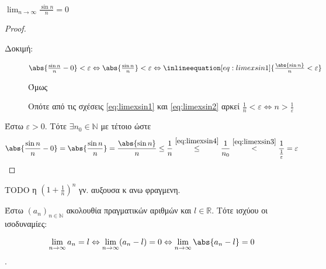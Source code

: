 \documentclass[main.tex]{subfiles}
\begin{document}
\begin{examples}
\begin{enumerate}[i)]
        \item $ \lim_{n \to \infty} \frac{\sin{n}}{n} = 0 $

            \begin{proof}
            \item {}
                \begin{description}
                    \item[Δοκιμή:] $ \abs{\frac{\sin{n}}{n} - 0} < 
                        \varepsilon \Leftrightarrow \abs{\frac{\sin{n}}{n}}
                        < \varepsilon \Leftrightarrow 
                        \inlineequation[eq:limexsin1]{\frac{\abs{\sin{n}}}
                        {n} < \varepsilon} $

                        Όμως

                        Οπότε από τις σχέσεις \eqref{eq:limexsin1} και 
                        \eqref{eq:limexsin2} αρκεί $ \frac{1}{n} < 
                        \varepsilon \Leftrightarrow n > \frac{1}{
                        \varepsilon} $
                \end{description}

                Έστω $ \varepsilon >0 $. Τότε $ \exists n_{0} \in \mathbb{N}
                $ με  τέτοιο ώστε
                \[
                    \abs{\frac{\sin{n}}{n} - 0} =  \abs{\frac{\sin{n}}{n}} =
                    \frac{\abs{\sin{n}}}{n} \leq \frac{1}{n}
                    \overset{\eqref{eq:limexsin4}}{\leq}  \frac{1}{n_{0}}
                    \overset{\eqref{eq:limexsin3}}{<}
                    \frac{1}{\frac{1}{\varepsilon}
                } = \varepsilon 
                 \] 
            \end{proof}
    \end{enumerate}
\end{examples}

TODO η $ (1+ \frac{1}{n} )^{n} $ γν. αυξουσα κ ανω φραγμενη.

\begin{prop}
    Έστω $ (a_{n})_{n \in \mathbb{N}} $ ακολουθία πραγματικών αριθμών και 
    $ l \in \mathbb{R} $. Τότε ισχύου οι ισοδυναμίες:

    \[ \lim_{n \to \infty} a_{n} = l \Leftrightarrow \lim_{n \to \infty} (
        a_{n}- l) = 0 
    \Leftrightarrow \lim_{n \to \infty} \abs{a_{n}-l} = 0\].
\end{prop}
\end{document}
